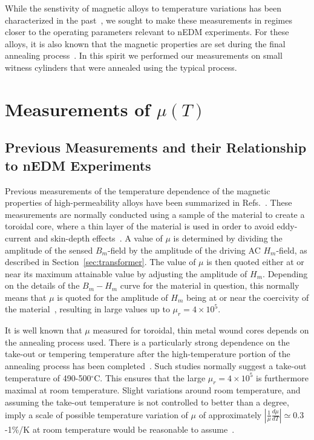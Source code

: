 \documentclass[review]{elsarticle}
\begin{document}
While the senstivity of magnetic alloys to temperature variations has
been characterized in the past~\cite{bib:couderchon,bib:kruppvdm}, we
sought to make these measurements in regimes closer to the operating
parameters relevant to nEDM experiments.  For these alloys, it is also
known that the magnetic properties are set during the final annealing
process~\cite{bib:gupta,bib:bozorth,bib:kruppvdm}.  In this spirit we
performed our measurements on small witness cylinders that were
annealed using the typical process.








\section{Measurements of $\mu(T)$}

\subsection{Previous Measurements and their Relationship to nEDM Experiments\label{sec:previousmeasurement}}

Previous measurements of the temperature dependence of the magnetic
properties of high-permeability alloys have been summarized in
Refs.~\cite{bib:pfeifer,bib:bozorth,bib:couderchon}.  These
measurements are normally conducted using a sample of the material to
create a toroidal core, where a thin layer of the material is used in
order to avoid eddy-current and skin-depth
effects~\cite{bib:pfeifer,bib:kruppvdm}.  A value of $\mu$ is
determined by dividing the amplitude of the sensed $B_m$-field by the
amplitude of the driving AC $H_m$-field, as described in
Section~\ref{sec:transformer}.  The value of $\mu$ is then quoted
either at or near its maximum attainable value by adjusting the
amplitude of $H_m$.  Depending on the details of the $B_m-H_m$ curve
for the material in question, this normally means that $\mu$ is quoted
for the amplitude of $H_m$ being at or near the coercivity of the
material~\cite{bib:couderchon,bib:kruppvdm}, resulting in large values
up to $\mu_r=4\times 10^5$.

It is well known that $\mu$ measured for toroidal, thin metal wound
cores depends on the annealing process used.  There is a particularly
strong dependence on the take-out or tempering temperature after the
high-temperature portion of the annealing process has been
completed~\cite{bib:pfeifer,bib:kruppvdm,bib:couderchon}.  Such
studies normally suggest a take-out temperature of 490-500$^\circ$C.
This ensures that the large $\mu_r=4\times 10^{5}$ is furthermore
maximal at room temperature.  Slight variations around room
temperature, and assuming the take-out temperature is not controlled
to better than a degree, imply a scale of possible temperature
variation of $\mu$ of approximately
$\left|\frac{1}{\mu}\frac{d\mu}{dT}\right|\simeq 0.3$-1\%/K at room temperature
would be reasonable to assume~\cite{bib:couderchon,bib:kruppvdm}.
\end{document}
